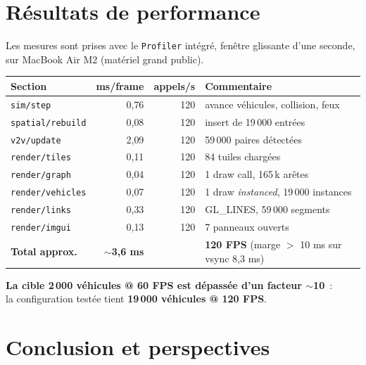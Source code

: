 \documentclass[a4paper,11pt]{article}
\begin{document}
\section{R\'esultats de performance}

Les mesures sont prises avec le \texttt{Profiler} int\'egr\'e, fen\^etre
glissante d'une seconde, sur MacBook Air M2 (mat\'eriel grand public).

\begin{center}\small
\renewcommand{\arraystretch}{1.3}
\begin{tabularx}{\linewidth}{l r r X}
\toprule\rowcolor{soft}
\textbf{Section} & \textbf{ms/frame} & \textbf{appels/s} & \textbf{Commentaire}\\\midrule
\texttt{sim/step}        & 0{,}76 & 120 & avance v\'ehicules, collision, feux\\
\texttt{spatial/rebuild} & 0{,}08 & 120 & insert de 19\,000 entr\'ees\\
\texttt{v2v/update}      & 2{,}09 & 120 & 59\,000 paires d\'etect\'ees\\
\texttt{render/tiles}    & 0{,}11 & 120 & 84 tuiles charg\'ees\\
\texttt{render/graph}    & 0{,}04 & 120 & 1 draw call, 165\,k ar\^etes\\
\texttt{render/vehicles} & 0{,}07 & 120 & 1 draw \emph{instanced}, 19\,000 instances\\
\texttt{render/links}    & 0{,}33 & 120 & GL\_LINES, 59\,000 segments\\
\texttt{render/imgui}    & 0{,}13 & 120 & 7 panneaux ouverts\\\midrule
\rowcolor{soft}\textbf{Total approx.} & \textbf{$\sim$3{,}6 ms} & & \textbf{120 FPS} (marge $>$ 10 ms sur vsync 8{,}3 ms)\\\bottomrule
\end{tabularx}
\end{center}

\begin{tcolorbox}[metric]
\centering
\textbf{La cible 2\,000 v\'ehicules @ 60 FPS est d\'epass\'ee d'un facteur $\sim$10}~:\\
la configuration test\'ee tient \textbf{19\,000 v\'ehicules @ 120 FPS}.
\end{tcolorbox}

\section{Conclusion et perspectives}
\end{document}
